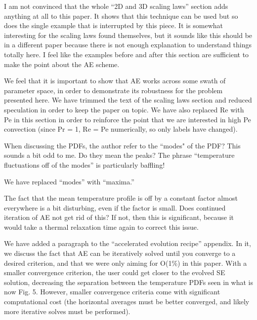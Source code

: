 \documentclass[aps, 11pt, singlecolumn]{revtex4-1} %
\begin{document}
\begin{singlespace}
\begin{myquotation}
I am not convinced that the whole ``2D and 3D scaling laws'' section
adds anything at all to this paper. It shows that this technique can
be used but so does the single example that is interrupted by this
piece. It is somewhat interesting for the scaling laws found
themselves, but it sounds like this should be in a different paper
because there is not enough explanation to understand things totally
here. I feel like the examples before and after this section are
sufficient to make the point about the AE scheme.
\end{myquotation}
We feel that it is important to show that AE works across some swath of parameter
space, in order to demonstrate its robustness for the problem presented here.
We have trimmed the text of the scaling laws section and reduced speculation in
order to keep the paper on topic. We have also replaced Re with Pe in this
section in order to reinforce the point that we are interested in high Pe
convection (since Pr = 1, Re = Pe numerically, so only labels have changed).

\begin{myquotation}
When discussing the PDFs, the author refer to the ``modes" of the PDF?
This sounds a bit odd to me. Do they mean the peaks? The phrase
``temperature fluctuations off of the modes'' is particularly baffling!
\end{myquotation}
We have replaced ``modes'' with ``maxima.''

\begin{myquotation}
The fact that the mean temperature profile is off by a constant factor
almost everywhere is a bit disturbing, even if the factor is small.
Does continued iteration of AE not get rid of this? If not, then this
is significant, because it would take a thermal relaxation time again
to correct this issue.
\end{myquotation}
We have added a paragraph to the ``accelerated evolution recipe'' appendix.
In it, we discuss the fact that AE can be iteratively solved until you converge
to a desired criterion, and that we were only aiming for O(1\%) in this
paper. With a smaller convergence criterion, the user
could get closer to the evolved SE solution, decreasing the separation
between the temperature PDFs seen in what is now Fig. 5. 
However, smaller convergence criteria
come with significant computational cost (the horizontal averages must be
better converged, and likely more iterative solves must be performed). 


\end{singlespace}
\end{document}
